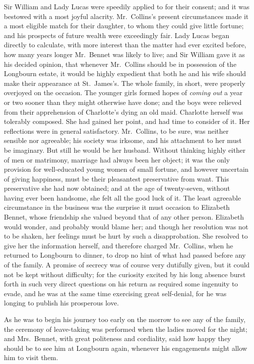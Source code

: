\documentclass[12pt,english]{book}
\begin{document}
Sir William and Lady Lucas were speedily applied to for their consent;
and it was bestowed with a most joyful alacrity. Mr.\ Collins's present
circumstances made it a most eligible match for their daughter, to
whom they could give little fortune; and his prospects of future wealth
were exceedingly fair. Lady Lucas began directly to calculate, with
more interest than the matter had ever excited before, how many years
longer Mr.\ Bennet was likely to live; and Sir William gave it as
his decided opinion, that whenever Mr.\ Collins should be in possession
of the Longbourn estate, it would be highly expedient that both he
and his wife should make their appearance at St.\ James's. The whole
family, in short, were properly overjoyed on the occasion. The younger
girls formed hopes of \textit{coming} \textit{out} a year or two sooner
than they might otherwise have done; and the boys were relieved from
their apprehension of Charlotte's dying an old maid. Charlotte herself
was tolerably composed. She had gained her point, and had time to
consider of it. Her reflections were in general satisfactory. Mr.\ Collins,
to be sure, was neither sensible nor agreeable; his society was irksome,
and his attachment to her must be imaginary. But still he would be
her husband. Without thinking highly either of men or matrimony, marriage
had always been her object; it was the only provision for well-educated
young women of small fortune, and however uncertain of giving happiness,
must be their pleasantest preservative from want. This preservative
she had now obtained; and at the age of twenty-seven, without having
ever been handsome, she felt all the good luck of it. The least agreeable
circumstance in the business was the surprise it must occasion to
Elizabeth Bennet, whose friendship she valued beyond that of any other
person. Elizabeth would wonder, and probably would blame her; and
though her resolution was not to be shaken, her feelings must be hurt
by such a disapprobation. She resolved to give her the information
herself, and therefore charged Mr.\ Collins, when he returned to
Longbourn to dinner, to drop no hint of what had passed before any
of the family. A promise of secrecy was of course very dutifully given,
but it could not be kept without difficulty; for the curiosity excited
by his long absence burst forth in such very direct questions on his
return as required some ingenuity to evade, and he was at the same
time exercising great self-denial, for he was longing to publish his
prosperous love.

As he was to begin his journey too early on the morrow to see any
of the family, the ceremony of leave-taking was performed when the
ladies moved for the night; and Mrs.\ Bennet, with great politeness
and cordiality, said how happy they should be to see him at Longbourn
again, whenever his engagements might allow him to visit them.
\end{document}
